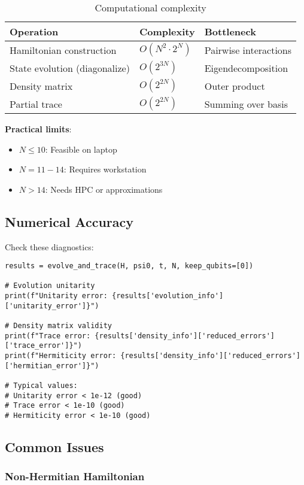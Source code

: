 \documentclass[11pt,a4paper]{article}
\begin{document}
\begin{table}[h]
\centering
\begin{tabular}{|l|l|l|}
\hline
\textbf{Operation} & \textbf{Complexity} & \textbf{Bottleneck} \\
\hline
Hamiltonian construction & $O(N^2 \cdot 2^N)$ & Pairwise interactions \\
State evolution (diagonalize) & $O(2^{3N})$ & Eigendecomposition \\
Density matrix & $O(2^{2N})$ & Outer product \\
Partial trace & $O(2^{2N})$ & Summing over basis \\
\hline
\end{tabular}
\caption{Computational complexity}
\end{table}

\textbf{Practical limits}:
\begin{itemize}
    \item $N \leq 10$: Feasible on laptop
    \item $N = 11-14$: Requires workstation
    \item $N > 14$: Needs HPC or approximations
\end{itemize}

\subsection{Numerical Accuracy}

Check these diagnostics:

\begin{lstlisting}[caption={Accuracy checks}]
results = evolve_and_trace(H, psi0, t, N, keep_qubits=[0])

# Evolution unitarity
print(f"Unitarity error: {results['evolution_info']['unitarity_error']}")

# Density matrix validity
print(f"Trace error: {results['density_info']['reduced_errors']['trace_error']}")
print(f"Hermiticity error: {results['density_info']['reduced_errors']['hermitian_error']}")

# Typical values:
# Unitarity error < 1e-12 (good)
# Trace error < 1e-10 (good)
# Hermiticity error < 1e-10 (good)
\end{lstlisting}

\subsection{Common Issues}

\subsubsection{Non-Hermitian Hamiltonian}
\end{document}
